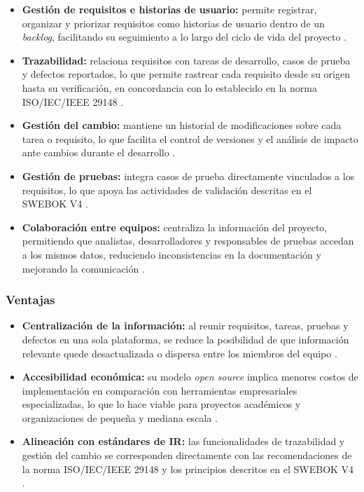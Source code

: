 \documentclass[journal,onecolumn]{IEEEtran}
\begin{document}
\begin{itemize}
  \item \textbf{Gestión de requisitos e historias de usuario:} permite registrar, organizar y
  priorizar requisitos como historias de usuario dentro de un \textit{backlog}, facilitando su
  seguimiento a lo largo del ciclo de vida del proyecto \cite{zentao2025}.

  \item \textbf{Trazabilidad:} relaciona requisitos con tareas de desarrollo, casos de prueba y
  defectos reportados, lo que permite rastrear cada requisito desde su origen hasta su verificación,
  en concordancia con lo establecido en la norma ISO/IEC/IEEE 29148 \cite{iso29148}.

  \item \textbf{Gestión del cambio:} mantiene un historial de modificaciones sobre cada tarea o
  requisito, lo que facilita el control de versiones y el análisis de impacto ante cambios durante
  el desarrollo \cite{zentao2025}.

  \item \textbf{Gestión de pruebas:} integra casos de prueba directamente vinculados a los
  requisitos, lo que apoya las actividades de validación descritas en el SWEBOK V4 \cite{swebok2024}.

  \item \textbf{Colaboración entre equipos:} centraliza la información del proyecto, permitiendo
  que analistas, desarrolladores y responsables de pruebas accedan a los mismos datos, reduciendo
  inconsistencias en la documentación y mejorando la comunicación \cite{zentao2025}.
\end{itemize}

\subsubsection{Ventajas}

\begin{itemize}
  \item \textbf{Centralización de la información:} al reunir requisitos, tareas, pruebas y
  defectos en una sola plataforma, se reduce la posibilidad de que información relevante quede
  desactualizada o dispersa entre los miembros del equipo \cite{zentao2025}.

  \item \textbf{Accesibilidad económica:} su modelo \textit{open source} implica menores costos
  de implementación en comparación con herramientas empresariales especializadas, lo que lo hace
  viable para proyectos académicos y organizaciones de pequeña y mediana escala \cite{zentao2025}.

  \item \textbf{Alineación con estándares de IR:} las funcionalidades de trazabilidad y gestión
  del cambio se corresponden directamente con las recomendaciones de la norma ISO/IEC/IEEE 29148
  y los principios descritos en el SWEBOK V4 \cite{iso29148, swebok2024}.
\end{itemize}
\end{document}

